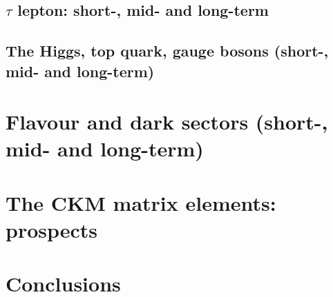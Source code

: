 \documentclass[../report.tex]{subfiles}
\begin{document}
\subsection{$\tau$ lepton: short-, mid- and long-term}

\subsection{The Higgs, top quark, gauge bosons (short-, mid- and long-term)}


\section{Flavour and dark sectors (short-, mid- and long-term)}


\section{The CKM matrix elements: prospects}\label{sec:CKM}

\section{Conclusions}

\end{document}
